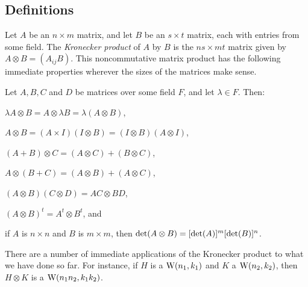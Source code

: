\documentclass[../../../main]{subfiles}
\begin{document}
\subsection{Definitions}

 Let $A$ be an $n \times m$ matrix, and let $B$ be an $s \times t$ matrix, each with entries from some field. The {\it Kronecker product} of $A$ by $B$ is the $ns \times mt$ matrix given by $A \otimes B = (A_{ij}B)$. This noncommutative matrix product has the following immediate properties wherever the sizes of the matrices make sense.
 
 \begin{lem}
  Let $A,B,C$ and $D$ be matrices over some field $F$, and let $\lambda \in F$. Then:
  \begin{defenum}
   \item $\lambda A \otimes B = A \otimes \lambda B = \lambda(A \otimes B)$,
   \item $A \otimes B = (A \times I)(I \otimes B) = (I \otimes B)(A \otimes I)$,
   \item $(A+B) \otimes C = (A \otimes C) + (B \otimes C)$,
   \item $A \otimes (B+C) = (A \otimes B) + (A \otimes C)$,
   \item $(A \otimes B)(C \otimes D) = AC \otimes BD$,
   \item $(A \otimes B)^t = A^t \otimes B^t$, and
   \item if $A$ is $n \times n$ and $B$ is $m \times m$, then $\text{det}(A \otimes B)=[\text{det}(A)]^m[\text{det}(B)]^n$.
  \end{defenum}
 \end{lem}
 
 There are a number of immediate applications of the Kronecker product to what we have done so far. For instance, if $H$ is a $\text{W}(n_1,k_1)$ and $K$ a $\text{W}(n_2,k_2)$, then $H \otimes K$ is a $\text{W}(n_1n_2,k_1k_2)$.
 
\end{document}
